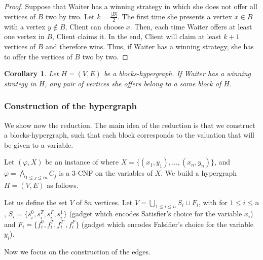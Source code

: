 \documentclass{article}
\newcommand{\PS}{\lang{Paired~SAT}\xspace}
\newcommand{\hyp}{H}
\newcommand{\WS}{E}
\newcommand{\som}{V}
\newcommand{\hxf}{\hyp = (\som, \WS)}
\newcommand{\hedges}{edges\xspace}
\newtheorem{corollary}[theorem]{Corollary}
\begin{document}
\begin{proof}
    Suppose that Waiter has a winning strategy in which she does not offer all vertices of $B$ two by two. Let $k = \frac{|B|}{2}$. The first time she presents a vertex $x\in B$ with a vertex $y \notin B$, Client can choose $x$. Then, each time Waiter offers at least one vertex in $B$, Client claims it. In the end, Client will claim at least $k+1$ vertices of $B$ and therefore wins. Thus, if Waiter has a winning strategy, she has to offer the vertices of $B$ two by two.
\end{proof}

\begin{corollary}\label{corollary: always play in blocks}
    Let $\hxf$ be a blocks-hypergraph. If Waiter has a winning strategy in $\hyp$, any pair of vertices she offers belong to a same block of $\hyp$.
\end{corollary}


\subsubsection{Construction of the hypergraph} \label{subsection construction client-waiter}

We show now the reduction. The main idea of the reduction is that we construct a blocks-hypergraph, such that each block corresponds to the valuation that will be given to a variable.






Let $(\varphi,X)$ be an instance of \PS where $X = \{(x_1, y_1),\ldots,(x_n, y_n)\}$, and $\varphi = \bigwedge_{1 \le j \le m} C_j$ is a 3-CNF on the variables of $X$. We build a hypergraph $\hxf$ as follows.

Let us define the set $\som$ of $8n$ vertices. Let $\som = \bigcup_{1 \le i \le n} S_i \cup F_i $, with for $1 \le i \le n$, $S_i = \{s_{i}^0,s_{i}^T,s_{i}^F,s_{i}^1\}$ (gadget which encodes Satisfier's choice for the variable $x_i$) and $F_i = \{f_{i}^0,f_{i}^T,f_{i}^{T'},f_{i}^F\}$ (gadget which encodes Falsifier's choice for the variable $y_i$).


Now we focus on the construction of the \hedges. 
\end{document}
